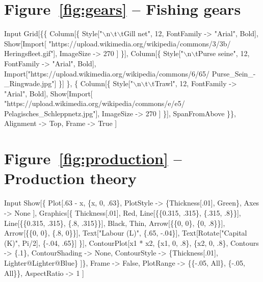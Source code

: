 \documentclass[11pt,fleqn]{book} %
\begin{document}
\section*{Figure~\ref{fig:gears} -- Fishing gears }
\small{
\begin{mmaCell}[index=1]{Input}
  Grid[\{\{
    Column[\{
      Style["\(\backslash\)n\(\backslash\)t\(\backslash\)tGill net", 12, FontFamily -> "Arial", Bold], 
      Show[Import[
        "https://upload.wikimedia.org/wikipedia/commons/3/3b/
          Heringsfleet.gif"], ImageSize -> 270
      ]
    \}], 
    Column[\{
      Style["\(\backslash\)n\(\backslash\)tPurse seine", 12, FontFamily -> "Arial", Bold], 
      Import["https://upload.wikimedia.org/wikipedia/commons/6/65/
        Purse_Sein_-_Ringwade.jpg"]
    \}]
  \}, \{
    Column[\{
      Style["\(\backslash\)n\(\backslash\)t\(\backslash\)tTrawl", 12, FontFamily -> "Arial", Bold], 
      Show[Import[
        "https://upload.wikimedia.org/wikipedia/commons/e/e5/
          Pelagisches_Schleppnetz.jpg"], ImageSize -> 270
      ]
    \}], 
    SpanFromAbove
  \}\}, 
  Alignment -> Top,
  Frame     -> True
  ]
\end{mmaCell}
}
\newpage
\section*{Figure~\ref{fig:production} -- Production theory }
\small{
\begin{mmaCell}[index=1]{Input}
  Show[\{
    Plot[.63 - x, \{x, 0, .63\}, 
      PlotStyle -> \{Thickness[.01], Green\}, Axes -> None
    ],
    Graphics[\{
      Thickness[.01], Red, 
      Line[\{\{0.315, .315\}, \{.315, .8\}\}], 
      Line[\{\{0.315, .315\}, \{.8, .315\}\}],
      Black, Thin, Arrow[\{\{0, 0\}, \{0, .8\}\}], 
      Arrow[\{\{0, 0\}, \{.8, 0\}\}],
      Text["Labour (L)", \{.65, -.04\}],
      Text[Rotate["Capital (K)", Pi/2], \{-.04, .65\}]
    \}],
    ContourPlot[x1 * x2, \{x1, 0, .8\}, \{x2, 0, .8\}, 
      Contours       -> \{.1\}, 
      ContourShading -> None, 
      ContourStyle   -> \{Thickness[.01], Lighter@Lighter@Blue\}
    ]\}, 
    Frame       -> False, 
    PlotRange   -> \{\{-.05, All\}, \{-.05, All\}\}, 
    AspectRatio -> 1
  ]
\end{mmaCell}
}
\end{document}
